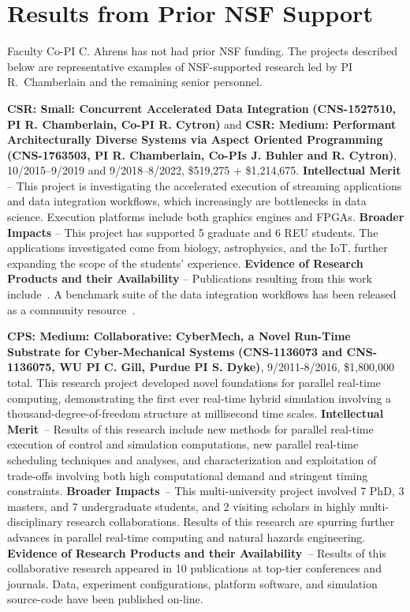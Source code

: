 \section{Results from Prior NSF Support}
\label{sec:prior}

Faculty Co-PI C. Ahrens has not had prior NSF funding.
The projects described
below are representative examples of NSF-supported research led by PI 
R.~Chamberlain and the remaining senior personnel.

{\bf CSR: Small: Concurrent Accelerated Data Integration}
{\bf (CNS-1527510,
PI R. Chamberlain, Co-PI R. Cytron)} and
{\bf CSR: Medium: Performant Architecturally Diverse Systems via Aspect Oriented Programming}
{\bf (CNS-1763503, PI R. Chamberlain, Co-PIs J. Buhler and R. Cytron)}, 
10/2015--9/2019 and 9/2018--8/2022, \$519,275 + \$1,214,675. 
%
\textbf{Intellectual Merit} -- This project is investigating the
accelerated execution of streaming applications and data integration workflows, which
increasingly are bottlenecks in data science. Execution platforms
include both graphics engines and FPGAs.
%
\textbf{Broader Impacts} -- This project has supported 5
graduate and 6 REU students.  The applications investigated
come from biology, astrophysics, and the IoT,
further expanding the scope of the students'
experience.
%
\textbf{Evidence of Research Products and their Availability} --
Publications resulting from this work include~\cite{cc19,ccb19,dibs,c17,fcbmc19,mgc16,js16}.
A benchmark suite of the data integration workflows has been released
as a community resource~\cite{dibsv1}.

{\bf CPS: Medium: Collaborative: CyberMech, a Novel Run-Time Substrate for 
Cyber-Mechanical Systems}
{\bf (CNS-1136073 and CNS-1136075,
WU PI C. Gill, Purdue PI S. Dyke)}, 9/2011-8/2016, \$1,800,000 total.  
%
This research project developed novel foundations for parallel real-time computing, demonstrating the first ever real-time hybrid simulation involving a thousand-degree-of-freedom structure at millisecond time scales.
%
\textbf{Intellectual Merit}~-- Results of this research include new methods for parallel real-time execution of control and simulation computations, new parallel real-time scheduling techniques and analyses, and characterization and exploitation of trade-offs involving both high computational demand and stringent timing constraints.
%
\textbf{Broader Impacts}~-- This multi-university project involved 7 PhD, 3 masters, and 7 undergraduate students, and 2 visiting scholars in highly multi-disciplinary research collaborations.  Results of this research are spurring
further advances in parallel real-time computing and natural hazards
engineering.
%
\textbf{Evidence of Research Products and their Availability}~-- Results of
this 
collaborative research appeared in 10 publications at
top-tier conferences and journals.
Data, experiment configurations, platform software, and simulation source-code 
have been published on-line.

